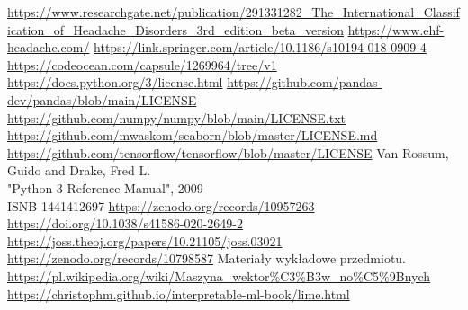\listoffigures

\begin{thebibliography}{10}
     \url{https://www.researchgate.net/publication/291331282_The_International_Classification_of_Headache_Disorders_3rd_edition_beta_version}
     \url{https://www.ehf-headache.com/}
     \url{https://link.springer.com/article/10.1186/s10194-018-0909-4}
     \url{https://codeocean.com/capsule/1269964/tree/v1}
     \url{https://docs.python.org/3/license.html}
     \url{https://github.com/pandas-dev/pandas/blob/main/LICENSE}
     \url{https://github.com/numpy/numpy/blob/main/LICENSE.txt}
     \url{https://github.com/mwaskom/seaborn/blob/master/LICENSE.md}
     \url{https://github.com/tensorflow/tensorflow/blob/master/LICENSE}
     Van Rossum, Guido and Drake, Fred L.\\
    "Python 3 Reference Manual", 2009\\
    ISNB 1441412697
     \url{https://zenodo.org/records/10957263}
     \url{https://doi.org/10.1038/s41586-020-2649-2}
     \url{https://joss.theoj.org/papers/10.21105/joss.03021}
     \url{https://zenodo.org/records/10798587}
     Materiały wykładowe przedmiotu.
     \url{https://pl.wikipedia.org/wiki/Maszyna_wektor%C3%B3w_no%C5%9Bnych}
     \url{https://christophm.github.io/interpretable-ml-book/lime.html}
\end{thebibliography}